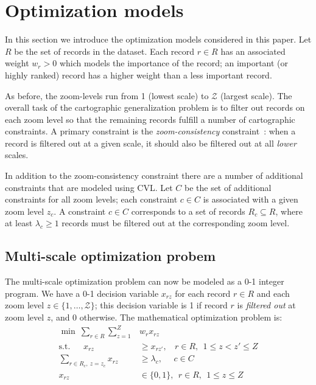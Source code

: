 \section{Optimization models}
\label{sec:optimizationmodel}

In this section we introduce the optimization models considered in this paper. Let $R$ be the set of records in the dataset. Each record $r \in R$ has an associated weight $w_r > 0$ which models the importance of the record; an important (or highly ranked) record has a higher weight than a less important record.

As before, the zoom-levels run from 1 (lowest scale) to $\mathcal{Z}$ (largest scale). The overall task of the cartographic generalization problem is to filter out records on each zoom level so that the remaining records fulfill a number of cartographic constraints. A primary constraint is the \emph{zoom-consistency} constraint~\cite{fusiontables}: when a record is filtered out at a given scale, it should also be filtered out at all \emph{lower} scales. 

In addition to the zoom-consistency constraint there are a number of additional constraints that are modeled using CVL. Let $C$ be the set of additional constraints for all zoom levels; each constraint $c \in C$ is associated with a given zoom level $z_c$. A constraint $c \in C$ corresponds to a set of records $R_c \subseteq R$, where at least $\lambda_c \geq 1$ records must be filtered out at the corresponding zoom level. 

\subsection{Multi-scale optimization probem}

The multi-scale optimization problem can now be modeled as a 0-1 integer program. We have a 0-1 decision variable $x_{rz}$ for each record $r \in R$ and each zoom level $z \in \{1,\ldots, \mathcal{Z}\}$; this decision variable is 1 if record $r$ is \emph{filtered out} at zoom level $z$, and 0 otherwise. The mathematical optimization problem is:
\begin{align}
  \label{eq:objective}
  \min ~\sum_{r \in R} \sum_{z=1}^Z &w_r x_{rz} \\
  \label{eq:zoom-consistency}
  \mbox{s.t.}~~~~~~~x_{rz} &\geq x_{rz'}, ~~~~r \in R, ~~1 \leq z < z' \leq Z \\
  \label{eq:general-constraints}
  \sum_{r \in R_c, ~z = z_c} x_{rz} &\geq \lambda_c, ~~~~~~ c \in C \\
  x_{rz} & \in \{0, 1\}, ~~ r \in R, ~~1 \leq z \leq Z
\end{align}

